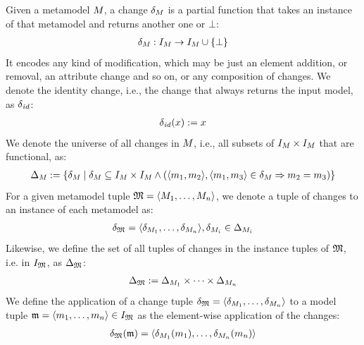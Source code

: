 \begin{definition}[Change]
    \label{def:change}
    Given a metamodel $M_{}$, a change $\delta_{M_{}}$ is a partial function that takes an instance of that metamodel and returns another one or $\bot$:
    \begin{align*}
        \delta_{M_{}}: I_{M_{}} \rightarrow I_{M_{}} \cup \{ \bot \}
    \end{align*}
    It encodes any kind of modification, which may be just an element addition, or removal, an attribute change and so on, or any composition of changes.
    We denote the identity change, i.e., the change that always returns the input model, as $\delta_{\mathit{id}}$:
    \begin{align*}
        \delta_{\mathit{id}}(x) := x
    \end{align*}
    We denote the universe of all changes in $M_{}$, i.e., all subsets of $I_{M_{}} \times I_{M_{}}$ that are functional, as:
    \begin{align*}
        \Delta_{M_{}} := \{ \delta_{M_{}} \mid \delta_{M_{}} \subseteq I_{M_{}} \times I_{M_{}} \land
        (\langle m_{1}, m_{2} \rangle, \langle m_{1}, m_{3} \rangle \in \delta_{M_{}} \Rightarrow m_{2} = m_{3}) \}
    \end{align*}
    For a given metamodel tuple $\mathfrak{M} = \langle M_{1}, \dots, M_{n} \rangle$, we denote a tuple of changes to an instance of each metamodel as:
    \begin{align*}
        \mathfrak{\delta}_{\mathfrak{M}} = \langle \delta_{M_{1}}, \dots, \delta_{M_{n}} \rangle, \delta_{M_{i}} \in \Delta_{M_{i}}
    \end{align*}
    Likewise, we define the set of all tuples of changes in the instance tuples of 
    $\mathfrak{M}$, i.e. in $I_{\mathfrak{M}}$, as $\Delta_{\mathfrak{M}}$:
    \begin{align*}
        \changeuniverse{\metamodeltuple{M}} \equalsperdefinition \changeuniverse{\metamodel{M}{1}} \times \dots \times \changeuniverse{\metamodel{M}{n}} %
    \end{align*}
    We define the application of a change tuple $\mathfrak{\delta}_{\mathfrak{M}} = \langle \delta_{M_{1}}, \dots, \delta_{M_{n}} \rangle$ to a model tuple $\mathfrak{m} = \langle m_{1}, \dots, m_{n} \rangle \in I_{\mathfrak{M}}$ as the element-wise application of the changes:
    \begin{align*}
        \mathfrak{\delta}_{\mathfrak{M}}(\mathfrak{m}) = \langle \delta_{M_{1}}(m_{1}), \dots, \delta_{M_{n}}(m_{n}) \rangle
    \end{align*}
\end{definition}


